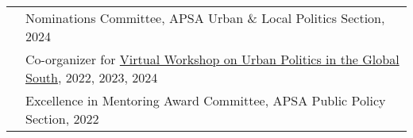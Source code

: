 \documentclass[letterpaper, 10.5pt]{article}
\begin{document}
\begin{longtable}{p{1.5in}p{5in}}
& Nominations Committee, APSA Urban \& Local Politics Section, 2024\\
 & Co-organizer for \href{https://www.globalsouthurbanpols.com}{Virtual Workshop on Urban Politics in the Global South}, 2022, 2023, 2024\\


&Excellence in Mentoring Award Committee, APSA Public Policy Section, 2022 \\






\end{longtable}
\vspace*{\fill}
\end{document}
